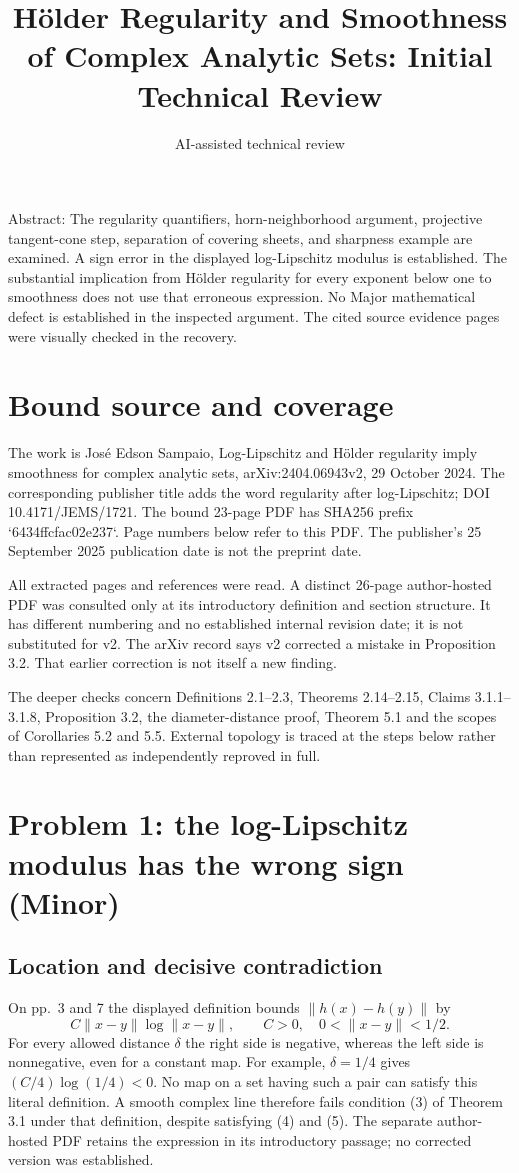 \documentclass[10pt]{article}
\title{Hölder Regularity and Smoothness of Complex Analytic Sets: Initial Technical Review}
\author{AI-assisted technical review}
\date{}
\begin{document}
\maketitle
Abstract: The regularity quantifiers, horn-neighborhood argument, projective tangent-cone step, separation of covering sheets, and sharpness example are examined. A sign error in the displayed log-Lipschitz modulus is established. The substantial implication from Hölder regularity for every exponent below one to smoothness does not use that erroneous expression. No Major mathematical defect is established in the inspected argument. The cited source evidence pages were visually checked in the recovery.\par
\section*{Bound source and coverage}
The work is José Edson Sampaio, Log-Lipschitz and Hölder regularity imply smoothness for complex analytic sets, arXiv:2404.06943v2, 29 October 2024. The corresponding publisher title adds the word regularity after log-Lipschitz; DOI 10.4171/JEMS/1721. The bound 23-page PDF has SHA256 prefix `6434ffcfac02e237`. Page numbers below refer to this PDF. The publisher’s 25 September 2025 publication date is not the preprint date.\par
All extracted pages and references were read. A distinct 26-page author-hosted PDF was consulted only at its introductory definition and section structure. It has different numbering and no established internal revision date; it is not substituted for v2. The arXiv record says v2 corrected a mistake in Proposition 3.2. That earlier correction is not itself a new finding.\par
The deeper checks concern Definitions 2.1–2.3, Theorems 2.14–2.15, Claims 3.1.1–3.1.8, Proposition 3.2, the diameter-distance proof, Theorem 5.1 and the scopes of Corollaries 5.2 and 5.5. External topology is traced at the steps below rather than represented as independently reproved in full.\par
\section*{Problem 1: the log-Lipschitz modulus has the wrong sign (Minor)}
\subsection*{Location and decisive contradiction}
On pp. 3 and 7 the displayed definition bounds \(\|h(x)-h(y)\|\) by \[C\|x-y\|\log\|x-y\|,\qquad C>0,\quad0<\|x-y\|<1/2.\] For every allowed distance \(\delta\) the right side is negative, whereas the left side is nonnegative, even for a constant map. For example, \(\delta=1/4\) gives \((C/4)\log(1/4)<0\). No map on a set having such a pair can satisfy this literal definition. A smooth complex line therefore fails condition (3) of Theorem 3.1 under that definition, despite satisfying (4) and (5). The separate author-hosted PDF retains the expression in its introductory passage; no corrected version was established.\par
\end{document}
